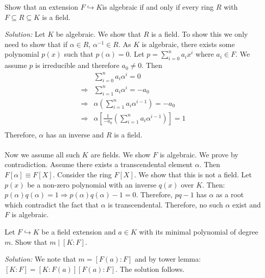 \documentclass[a4paper, 11pt]{article}
\newenvironment{solution}
    {\textit{Solution:}}
    {}
\begin{document}
\begin{tcolorbox}[colback=c2,colframe=c1,title=Problem 1.6]
    Show that an extension $F\hookrightarrow K $is algebraic if and only if every ring $R$ with
$F \subseteq R \subseteq K$ is a field.
\end{tcolorbox}
\begin{solution}
    Let $K$ be algebraic. We show that $R$ is a field. To show this we only need to show that if $\alpha\in R$, $\alpha^{-1}\in R$. As $K$ is algebraic, there exists some polynomial $p(x)$ such that $p(\alpha)=0$. Let $p=\sum_{i=0}^na_ix^i$ where $a_i\in F$. We assume $p$ is irreducible and therefore $a_0\ne0$. Then
    \begin{align*}
        &\sum_{i=0}^na_i\alpha^i=0\\
        \Rightarrow&\sum_{i=1}^na_i\alpha^i=-a_0\\
        \Rightarrow&\alpha\left(\sum_{i=1}^na_i\alpha^{i-1}\right)=-a_0\\
        \Rightarrow&\alpha\left[\frac{1}{-a_0}\left(\sum_{i=1}^na_i\alpha^{i-1}\right)\right]=1\\
    \end{align*}
    Therefore, $\alpha$ has an inverse and $R$ is a field.\\\\
    Now we assume all such $K$ are fields. We show $F$ is algebraic. We prove by contradiction. Assume there exists a transcendental  element $\alpha$. Then $F[\alpha]\equiv F[X]$. Consider the ring $F[X]$. We show that this is not a field. Let $p(x)$ be a non-zero polynomial with an inverse $q(x)$ over $K$. Then:
    $p(\alpha)q(\alpha)=1\Rightarrow p(\alpha)q(\alpha)-1=0$. Therefore, $pq-1$ has $\alpha$ as a root which contradict the fact that $\alpha$ is transcendental. Therefore, no such $\alpha$ exist and  $F$ is algebraic.
\end{solution}



\begin{tcolorbox}[colback=c2,colframe=c1,title=Problem 1.7]
    Let $F\hookrightarrow K$  be a field extension and $a \in K$ with its minimal polynomial of
degree $m$. Show that $m\mid[K : F]$.
\end{tcolorbox}
\begin{solution}
    We note that $m=[F(a):F]$ and by tower lemma: $[K:F]=[K:F(a)][F(a):F]$. The solution follows. 
\end{solution}
\end{document}

